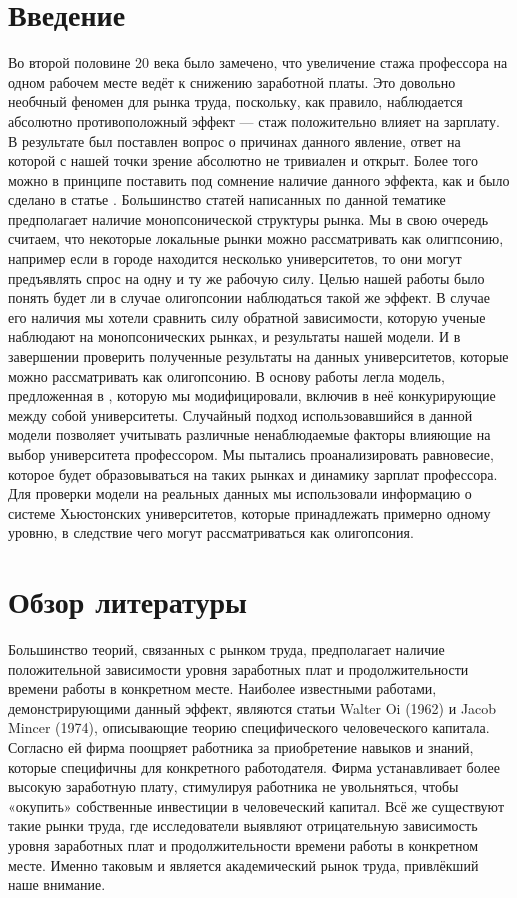 \documentclass[a4paper, 12pt]{article}
\theoremstyle{definition}
\theoremstyle{plain}
\begin{document}
\section{Введение}
Во второй половине 20 века было замечено, что увеличение стажа профессора на одном рабочем месте ведёт к снижению заработной платы.  Это довольно необчный феномен  для рынка труда, поскольку, как правило, наблюдается абсолютно противоположный эффект --- стаж положительно влияет на зарплату. В результате был поставлен вопрос о причинах данного явление, ответ на которой с нашей точки зрение абсолютно не тривиален и открыт. Более того можно в принципе поставить под сомнение наличие данного эффекта, как и было сделано в статье \cite{3}. Большинство статей написанных по данной тематике предполагает наличие монопсонической структуры рынка. Мы в свою очередь считаем, что некоторые локальные рынки можно рассматривать как олигпсонию, например если в городе находится несколько университетов, то они могут предъявлять спрос на одну и ту же рабочую силу. Целью нашей работы было понять будет ли в случае олигопсонии наблюдаться такой же эффект. В случае его наличия мы хотели сравнить силу обратной зависимости, которую ученые наблюдают на монопсонических рынках, и результаты нашей модели. И в завершении проверить полученные результаты на данных университетов, которые можно рассматривать как олигопсонию. В основу работы легла модель, предложенная в \cite{1}, которую мы модифицировали, включив в неё конкурирующие между собой университеты. Случайный подход использовавшийся в данной модели позволяет учитывать различные ненаблюдаемые факторы влияющие на выбор университета профессором. Мы пытались проанализировать равновесие, которое будет образовываться на таких рынках и динамику зарплат профессора. Для проверки модели на реальных данных мы использовали информацию о системе Хьюстонских университетов, которые принадлежать примерно одному уровню, в следствие чего могут рассматриваться как олигопсония. 

\section{Обзор литературы}

Большинство теорий, связанных с рынком труда, предполагает наличие положительной зависимости уровня заработных плат и продолжительности времени работы в конкретном месте. Наиболее известными работами, демонстрирующими данный эффект, являются статьи Walter Oi (1962) и Jacob Mincer (1974), описывающие теорию специфического человеческого капитала. Согласно ей фирма поощряет работника за приобретение навыков и знаний, которые специфичны для конкретного работодателя. Фирма устанавливает более высокую заработную плату, стимулируя работника не увольняться, чтобы «окупить» собственные инвестиции в человеческий капитал. Всё же существуют такие рынки труда, где исследователи выявляют отрицательную зависимость уровня заработных плат и продолжительности времени работы в конкретном месте. Именно таковым и является академический рынок труда, привлёкший наше внимание.
\end{document}
